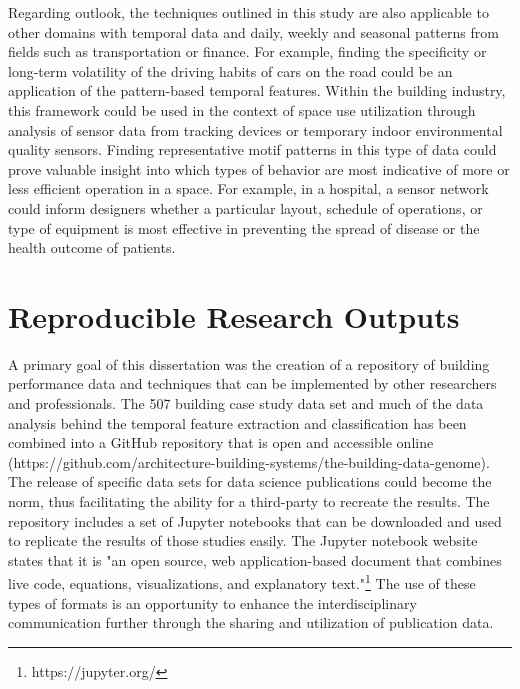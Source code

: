 Regarding outlook, the techniques outlined in this study are also applicable to other domains with temporal data and daily, weekly and seasonal patterns from fields such as transportation or finance. For example, finding the specificity or long-term volatility of the driving habits of cars on the road could be an application of the pattern-based temporal features. Within the building industry, this framework could be used in the context of space use utilization through analysis of sensor data from tracking devices or temporary indoor environmental quality sensors. Finding representative motif patterns in this type of data could prove valuable insight into which types of behavior are most indicative of more or less efficient operation in a space. For example, in a hospital, a sensor network could inform designers whether a particular layout, schedule of operations, or type of equipment is most effective in preventing the spread of disease or the health outcome of patients.

\section{Reproducible Research Outputs}
\label{sec:reproducibleresearch}
A primary goal of this dissertation was the creation of a repository of building performance data and techniques that can be implemented by other researchers and professionals. The 507 building case study data set and much of the data analysis behind the temporal feature extraction and classification has been combined into a GitHub repository that is open and accessible online (https://github.com/architecture-building-systems/the-building-data-genome). The release of specific data sets for data science publications could become the norm, thus facilitating the ability for a third-party to recreate the results.  The repository includes a set of Jupyter notebooks that can be downloaded and used to replicate the results of those studies easily. The Jupyter notebook website states that it is "an open source, web application-based document that combines live code, equations, visualizations, and explanatory text."\footnote{https://jupyter.org/} The use of these types of formats is an opportunity to enhance the interdisciplinary communication further through the sharing and utilization of publication data. 




